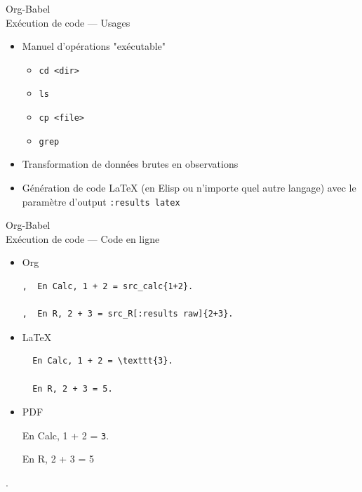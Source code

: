 \documentclass[presentation,t,hideothersubsections]{beamer}
\begin{document}
\begin{frame}[fragile,label=sec-5-7-3]{Org-Babel \\ Exécution de code --- Usages}
 \begin{itemize}
\item Manuel d'opérations "exécutable"
\begin{itemize}
\item \texttt{cd <dir>}
\item \texttt{ls}
\item \texttt{cp <file>}
\item \texttt{grep}
\end{itemize}

\item Transformation de données brutes en observations

\item Génération de code \LaTeX{} (en Elisp ou n'importe quel autre langage) avec le
paramètre d'output \texttt{:results latex}
\end{itemize}
\end{frame}
\begin{frame}[fragile,label=sec-5-7-4]{Org-Babel \\ Exécution de code --- Code en ligne}
 \begin{itemize}
\item Org

\lstset{language=org,numbers=none}
\begin{lstlisting}
,  En Calc, 1 + 2 = src_calc{1+2}.

,  En R, 2 + 3 = src_R[:results raw]{2+3}.
\end{lstlisting}

\item \LaTeX{}

\lstset{language=TeX,numbers=none}
\begin{lstlisting}
  En Calc, 1 + 2 = \texttt{3}.

  En R, 2 + 3 = 5.
\end{lstlisting}

\item PDF

En Calc, 1 + 2 = \texttt{3}.

En R, 2 + 3 = 5
\end{itemize}
.
\end{frame}
\end{document}
